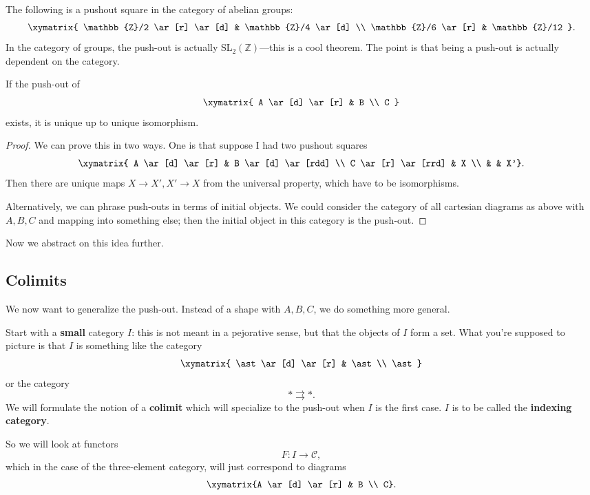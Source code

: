 \begin{example} The following is a pushout square in the category of abelian
groups: \[ \xymatrix{ \mathbb{Z}/2 \ar[r] \ar[d] & \mathbb{Z}/4 \ar[d] \\
\mathbb{Z}/6 \ar[r] & \mathbb{Z}/12 }.\] In the category of groups, the
push-out is actually $\mathrm{SL}_2(\mathbb{Z})$---this is a cool theorem. The
point is that being a push-out is actually dependent on the category.
\end{example}

\begin{proposition} If the push-out of \[ \xymatrix{ A \ar[d] \ar[r] & B \\ C
}\] exists, it is unique up to unique isomorphism. \end{proposition}
\begin{proof} We can prove this in two ways. One is that suppose I had two
pushout squares \[ \xymatrix{ A \ar[d] \ar[r] & B \ar[d] \ar[rdd] \\ C \ar[r]
\ar[rrd] & X \\ & & X'}. \] Then there are unique maps $X \to X', X' \to X$
from the universal property, which have to be isomorphisms.

Alternatively, we can phrase push-outs in terms of initial objects. We could
consider the category of all cartesian diagrams as above with $A,B,C$ and
mapping into something else; then the initial object in this category is the
push-out. \end{proof}

Now we abstract on this idea further.

\subsection{Colimits}

We now want to generalize the push-out. Instead of a shape with $A,B,C$, we do
something more general.

Start with a \textbf{small} category $I$: this is not meant in a pejorative
sense, but that the objects of $I$ form a set. What you're supposed to picture
is that $I$ is something like the category \[ \xymatrix{ \ast \ar[d] \ar[r] &
\ast \\ \ast } \] or the category \[ \ast \rightrightarrows \ast. \] We will
formulate the notion of a \textbf{colimit} which will specialize to the
push-out when $I$ is the first case. $I$ is to be called the \textbf{indexing
category}.

So we will look at functors \[ F: I \to \mathcal{C}, \] which in the case of
the three-element category, will just correspond to diagrams \[ \xymatrix{A
\ar[d] \ar[r] & B \\ C}. \]

